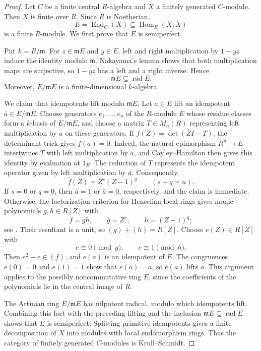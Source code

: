\documentclass[12pt,a4paper,english,reqno]{amsart}
\numberwithin{equation}{section}
\theoremstyle{plain}
\theoremstyle{definition}
\begin{document}
\begin{proof}
Let $C$ be a finite central $R$-algebra and $X$ a finitely generated
$C$-module.  Then $X$ is finite over $R$.  Since $R$ is Noetherian,
\[
 E=\operatorname{End}_C(X)
 \subseteq\operatorname{Hom}_R(X,X)
\]
is a finite $R$-module.  We first prove that $E$ is semiperfect.

Put $k=R/\mathfrak m$.  For $z\in\mathfrak mE$ and $y\in E$,
left and right multiplication by $1-yz$ induce the identity modulo
$\mathfrak m$.  Nakayama's lemma shows that both multiplication maps
are surjective, so $1-yz$ has a left and a right inverse.  Hence
\[
 \mathfrak mE\subseteq\operatorname{rad}E.
\]
Moreover, $E/\mathfrak mE$ is a finite-dimensional $k$-algebra.

We claim that idempotents lift modulo $\mathfrak mE$.  Let $a\in E$
lift an idempotent $\bar a\in E/\mathfrak mE$.  Choose generators
$e_1,\ldots,e_n$ of the $R$-module $E$ whose residue classes form a
$k$-basis of $E/\mathfrak mE$, and choose a matrix $T\in M_n(R)$
representing left multiplication by $a$ on these generators.  If
$f(Z)=\det(ZI-T)$, the determinant trick gives $f(a)=0$.
Indeed, the natural epimorphism $R^n\to E$ intertwines $T$ with
left multiplication by $a$, and Cayley--Hamilton then gives this
identity by evaluation at $1_E$.
The reduction of $T$ represents the idempotent operator given by
left multiplication by $\bar a$.  Consequently,
\[
 \bar f(Z)=Z^s(Z-1)^q
 \qquad(s+q=n).
\]
If $s=0$ or $q=0$, then $\bar a=1$ or $\bar a=0$, respectively,
and the claim is immediate.  Otherwise, the factorization criterion
for Henselian local rings gives monic polynomials $g,h\in R[Z]$ with
\[
 f=gh,\qquad \bar g=Z^s,\qquad \bar h=(Z-1)^q;
\]
see \cite[Lemma~10.153.3]{StacksHenselian2026}.
Their resultant is a unit, so $(g)+(h)=R[Z]$.  Choose $e(Z)\in R[Z]$
with
\[
 e\equiv0\pmod g,\qquad e\equiv1\pmod h.
\]
Then $e^2-e\in(f)$, and $e(a)$ is an idempotent of $E$.
The congruences $\bar e(0)=0$ and $\bar e(1)=1$ show that
$\bar e(\bar a)=\bar a$, so $e(a)$ lifts $\bar a$.
This argument applies to the possibly noncommutative ring $E$,
since the coefficients of the polynomials lie in the central
image of $R$.

The Artinian ring $E/\mathfrak mE$ has nilpotent radical, modulo
which idempotents lift.  Combining this fact with the preceding
lifting and the inclusion $\mathfrak mE\subseteq\operatorname{rad}E$
shows that $E$ is semiperfect.  Splitting primitive idempotents gives
a finite decomposition of $X$ into modules with local endomorphism
rings.  Thus the category of finitely generated $C$-modules is
Krull--Schmidt.


\end{proof}
\end{document}
